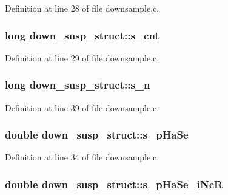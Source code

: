 Definition at line 28 of file downsample.\+c.

\subsubsection[{\texorpdfstring{s\+\_\+cnt}{s_cnt}}]{\setlength{\rightskip}{0pt plus 5cm}long down\+\_\+susp\+\_\+struct\+::s\+\_\+cnt}\hypertarget{structdown__susp__struct_a3562884b24c0a87540acdf32ee0739d1}{}\label{structdown__susp__struct_a3562884b24c0a87540acdf32ee0739d1}


Definition at line 29 of file downsample.\+c.

\subsubsection[{\texorpdfstring{s\+\_\+n}{s_n}}]{\setlength{\rightskip}{0pt plus 5cm}long down\+\_\+susp\+\_\+struct\+::s\+\_\+n}\hypertarget{structdown__susp__struct_a415e03bb3f0a6bceba815b521be75d12}{}\label{structdown__susp__struct_a415e03bb3f0a6bceba815b521be75d12}


Definition at line 39 of file downsample.\+c.

\subsubsection[{\texorpdfstring{s\+\_\+p\+Ha\+Se}{s_pHaSe}}]{\setlength{\rightskip}{0pt plus 5cm}double down\+\_\+susp\+\_\+struct\+::s\+\_\+p\+Ha\+Se}\hypertarget{structdown__susp__struct_adcc32253278270f7b42a332916191e4e}{}\label{structdown__susp__struct_adcc32253278270f7b42a332916191e4e}


Definition at line 34 of file downsample.\+c.

\subsubsection[{\texorpdfstring{s\+\_\+p\+Ha\+Se\+\_\+i\+NcR}{s_pHaSe_iNcR}}]{\setlength{\rightskip}{0pt plus 5cm}double down\+\_\+susp\+\_\+struct\+::s\+\_\+p\+Ha\+Se\+\_\+i\+NcR}\hypertarget{structdown__susp__struct_aa1832011256a6e7d66a89177f93f257c}{}\label{structdown__susp__struct_aa1832011256a6e7d66a89177f93f257c}


